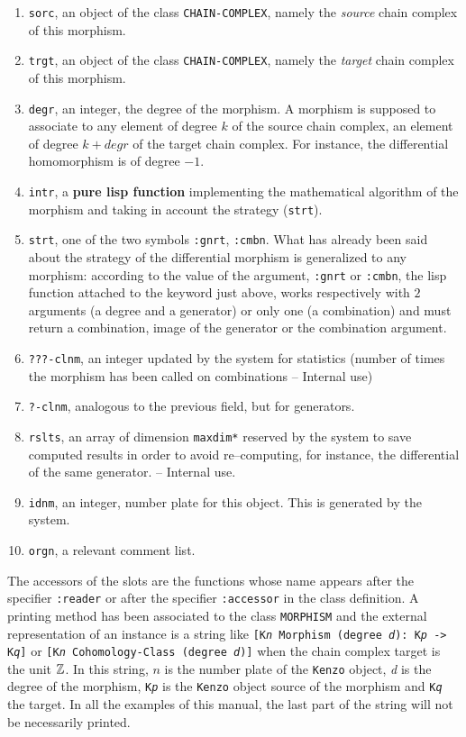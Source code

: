 \begin{enumerate}
\item {\tt sorc}, an object of the class {\tt CHAIN-COMPLEX}, namely the {\em source} chain complex
of this morphism.
\item {\tt trgt}, an object of the class {\tt CHAIN-COMPLEX}, namely the {\em target} chain complex of this morphism.
\item {\tt degr}, an integer, the degree of the morphism. A morphism is supposed to associate
to any element of degree $k$ of the source chain complex, an element of degree $k + degr$ of the
target chain complex. For instance, the differential homomorphism is of degree $-1$.
\item {\tt intr}, a {\bf pure lisp function} implementing the mathematical algorithm of the morphism and
taking in account the strategy ({\tt strt}).
\item {\tt strt}, one of the two symbols {\tt :gnrt}, {\tt :cmbn}. What has already been  said about
the strategy of the differential morphism is generalized to any morphism: according
to the value of the argument, {\tt :gnrt} or {\tt :cmbn}, the lisp function attached to the keyword just above,
works respectively with $2$ arguments (a degree and a generator) or
only one (a combination) and must return a combination, image of the generator or the combination argument.
\item {\tt ???-clnm}, an integer updated by the system for statistics (number of times the
morphism has been called on combinations -- Internal use)
\item {\tt ?-clnm}, analogous to the previous field, but for generators.
\item {\tt rslts}, an array of dimension {\tt *maxdim*} reserved by the system to save  computed
results in order to avoid  re--computing, for instance, the differential of the same
generator. -- Internal use.
\item {\tt idnm}, an integer, number plate for this object. This is generated by
the system.
\item {\tt orgn}, a relevant comment list.
\end{enumerate}
The accessors of the slots are the functions whose name appears after the specifier {\tt :reader}
or after the specifier {\tt :accessor} in the class definition.
A printing method has been associated to the class {\tt MORPHISM}
and the external representation of  an instance is a string like
{\tt [K{\em n} Morphism (degree {\em d}): K{\em p} -> K{\em q}]}
or {\tt [K{\em n} Cohomology-Class (degree {\em d})]}
when the chain complex target is the unit ${\mathbb{Z}}$. In this
string,  $n$ is the number plate of the {\tt Kenzo} object, {\em d} is the degree of the morphism,
{\tt K{\em p}} is the {\tt Kenzo} object source of the morphism and {\tt K{\em q}} the target.
In all the  examples of this manual, the last part of the string will not be necessarily printed.

